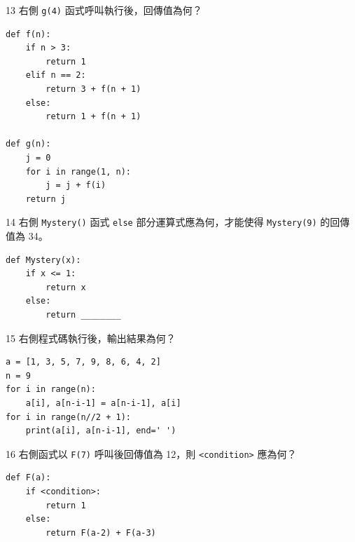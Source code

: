 \medskip

\begin{qbox}{13}
右側 \texttt{g(4)} 函式呼叫執行後，回傳值為何？

\begin{verbatim}
def f(n):
    if n > 3:
        return 1
    elif n == 2:
        return 3 + f(n + 1)
    else:
        return 1 + f(n + 1)

def g(n):
    j = 0
    for i in range(1, n):
        j = j + f(i)
    return j
\end{verbatim}

\end{qbox}

\medskip

\begin{qbox}{14}
右側 \texttt{Mystery()} 函式 \texttt{else} 部分運算式應為何，才能使得 \texttt{Mystery(9)} 的回傳值為 34。

\begin{verbatim}
def Mystery(x):
    if x <= 1:
        return x
    else:
        return ________
\end{verbatim}

\end{qbox}

\medskip

\begin{qbox}{15}
右側程式碼執行後，輸出結果為何？

\begin{verbatim}
a = [1, 3, 5, 7, 9, 8, 6, 4, 2]
n = 9
for i in range(n):
    a[i], a[n-i-1] = a[n-i-1], a[i]
for i in range(n//2 + 1):
    print(a[i], a[n-i-1], end=' ')
\end{verbatim}

\end{qbox}

\medskip

\begin{qbox}{16}
右側函式以 \texttt{F(7)} 呼叫後回傳值為 12，則 \texttt{<condition>} 應為何？

\begin{verbatim}
def F(a):
    if <condition>:
        return 1
    else:
        return F(a-2) + F(a-3)
\end{verbatim}

\end{qbox}

